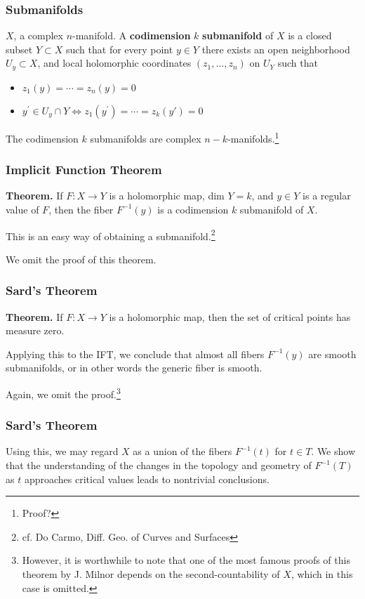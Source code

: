 \documentclass{beamer}
\begin{document}

\begin{frame}
\frametitle{Submanifolds}

$X$, a complex $n$-manifold. A \textbf{codimension} $k$ \textbf{submanifold} of $X$ is a closed subset $Y\subset X$ such that for every point $y \in Y$ there exists an open neighborhood $U_y \subset X$, and local holomorphic coordinates $(z_1,\ldots,z_n)$ on $U_Y$ such that \begin{itemize}
    \item $z_1(y) = \cdots = z_n(y) = 0$
    \item $y^\prime \in U_y \cap Y \iff z_1(y^\prime) = \cdots = z_k(y\prime) = 0$
\end{itemize}

The codimension $k$ submanifolds are complex $n-k$-manifolds.\footnote{Proof?}

\end{frame}


\begin{frame}
\frametitle{Implicit Function Theorem}

\textbf{Theorem.} If $F: X \to Y$ is a holomorphic map, dim $Y = k$, and $y \in Y$ is a regular value of $F$, then the fiber $F^{-1}(y)$ is a codimension $k$ submanifold of $X$.

This is an easy way of obtaining a submanifold.\footnote{cf. Do Carmo, Diff. Geo. of Curves and Surfaces}

We omit the proof of this theorem.

\end{frame}



\begin{frame}
\frametitle{Sard's Theorem}

\textbf{Theorem.} If $F : X\to Y$ is a holomorphic map, then the set of critical points has measure zero.

Applying this to the IFT, we conclude that almost all fibers $F^{-1}(y)$ are smooth submanifolds, or in other words the generic fiber is smooth.

Again, we omit the proof.\footnote{However, it is worthwhile to note that one of the most famous proofs of this theorem by J. Milnor depends on the second-countability of $X$, which in this case is omitted.}

\end{frame}


\begin{frame}
\frametitle{Sard's Theorem}

Using this, we may regard $X$ as a union of the fibers $F^{-1}(t)$ for $t\in T$. We show that the understanding of the changes in the topology and geometry of $F^{-1}(T)$ as $t$ approaches critical values leads to nontrivial conclusions.

\end{frame}
\end{document}
